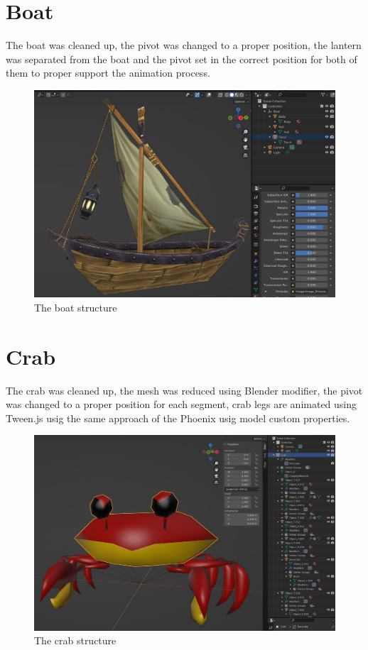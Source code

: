 \documentclass[10pt,a4paper]{article}
\begin{document}
\section{Boat}

The boat was cleaned up, the pivot was changed to a proper position, the lantern was separated from the boat and the pivot set in the correct position for both of them to proper support the animation process.

\begin{center}
\begin{figure}[H]
\caption{The boat structure}
\includegraphics[width=1\textwidth]{boat}
\end{figure}
\end{center}


\section{Crab}

The crab was cleaned up, the mesh was reduced using Blender modifier, the pivot was changed to a proper position for each segment, crab legs are animated using Tween.js usig the same approach of the Phoenix usig model custom properties.

\begin{center}
\begin{figure}[H]
\caption{The crab structure}
\includegraphics[width=1\textwidth]{crab}
\end{figure}
\end{center}
\end{document}
